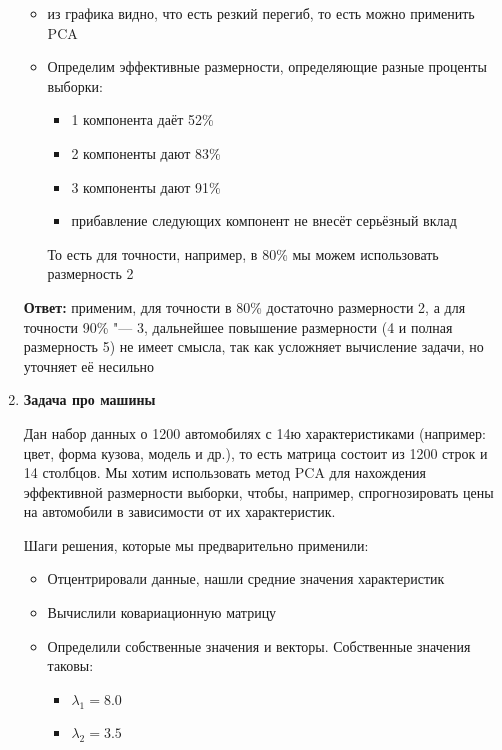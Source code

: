 \begin{enumerate}
\begin{itemize}
              \item из графика видно, что есть резкий перегиб, то есть можно применить PCA
              \item Определим эффективные размерности, определяющие разные проценты выборки: \par
                    \begin{itemize}
                        \item 1 компонента даёт 52\%
                        \item 2 компоненты дают 83\%
                        \item 3 компоненты дают 91\%
                        \item прибавление следующих компонент не внесёт серьёзный вклад
                    \end{itemize}\par
                    То есть для точности, например, в 80\% мы можем использовать размерность 2
          \end{itemize}
          \textbf{Ответ:} применим, для точности в 80\% достаточно размерности 2, а для точности 90\% "--- 3, дальнейшее повышение размерности (4 и полная размерность 5) не имеет смысла, так как усложняет вычисление задачи, но уточняет её несильно
    \item \textbf{Задача про машины} \par
          Дан набор данных о 1200 автомобилях с 14ю характеристиками (например: цвет, форма кузова, модель и др.), то есть матрица состоит из 1200 строк и 14 столбцов. Мы хотим использовать метод PCA для нахождения эффективной размерности выборки, чтобы, например, спрогнозировать цены на автомобили в зависимости от их характеристик. \par
          Шаги решения, которые мы предварительно применили:\par
          \begin{itemize}
              \item Отцентрировали данные, нашли средние значения характеристик
              \item Вычислили ковариационную матрицу
              \item Определили собственные значения и векторы. Собственные значения таковы: \par
                    \begin{itemize}
                        \item $\lambda_{1}  = 8.0$
                        \item $\lambda_{2}  = 3.5$

\end{itemize}
\end{itemize}
\end{enumerate}
